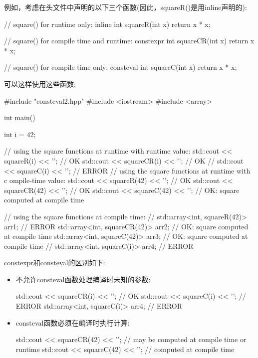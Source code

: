 例如，考虑在头文件中声明的以下三个函数(因此，squareR()是用inline声明的):


\begin{cpp}
// square() for runtime only:
inline int squareR(int x) {
	return x * x;
}

// square() for compile time and runtime:
constexpr int squareCR(int x) {
	return x * x;
}

// square() for compile time only:
consteval int squareC(int x) {
	return x * x;
}
\end{cpp}

可以这样使用这些函数:


\begin{cpp}
#include "consteval2.hpp"
#include <iostream>
#include <array>

int main()
{
	int i = 42;
	
	// using the square functions at runtime with runtime value:
	std::cout << squareR(i) << '\n'; // OK
	std::cout << squareCR(i) << '\n'; // OK
	// std::cout << squareC(i) << ’’; // ERROR
	// using the square functions at runtime with c
	ompile-time value:
	std::cout << squareR(42) << '\n'; // OK
	std::cout << squareCR(42) << '\n'; // OK
	std::cout << squareC(42) << '\n'; // OK: square computed at compile time
	
	// using the square functions at compile time:
	// std::array<int, squareR(42)> arr1; // ERROR
	std::array<int, squareCR(42)> arr2; // OK: square computed at compile time
	std::array<int, squareC(42)> arr3; // OK: square computed at compile time
	// std::array<int, squareC(i)> arr4; // ERROR
}
\end{cpp}

constexpr和consteval的区别如下:

\begin{itemize}
\item 
不允许consteval函数处理编译时未知的参数:

\begin{cpp}
std::cout << squareCR(i) << '\n'; // OK
std::cout << squareC(i) << '\n'; // ERROR
std::array<int, squareC(i)> arr4; // ERROR
\end{cpp}

\item 
consteval函数必须在编译时执行计算:

\begin{cpp}
std::cout << squareCR(42) << '\n'; // may be computed at compile time or runtime
std::cout << squareC(42) << '\n'; // computed at compile time
\end{cpp}

\end{itemize}

